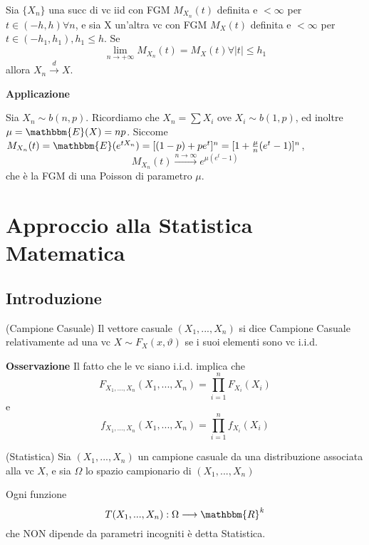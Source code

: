 \begin{teo}
Sia $\{X_n\}$ una succ di vc iid con FGM $M_{X_n}(t)$ definita e $<\infty$ per $t\in(-h,h) \forall n$, e sia X un'altra vc con FGM $M_X(t)$ definita e $<\infty$ per $t \in (-h_1,h_1), h_1\leq h$. Se $$\lim_{n \rightarrow +\infty} M_{X_n}(t)=M_X(t) \forall |t| \leq h_1$$ allora $X_n \stackrel{d}{\rightarrow} X$.
\end{teo}
\textbf{Applicazione}

Sia $X_n \sim b(n,p)$. 
Ricordiamo che $X_n=\sum X_i$ ove $X_i \sim b(1,p)$, ed inoltre $\mu=\mathbbm{E}(X)=np$.
Siccome $M_{X_n}(t)=
\mathbbm{E}(e^{tX_n})=[(1-p)+pe^t]^n=
[1+\frac{\mu}{n}(e^t - 1)]^n$, 
$$ M_{X_n}(t) \stackrel{n \rightarrow \infty}{\longrightarrow} 
e^{\mu(e^t-1)}$$
che è la FGM di una Poisson di parametro $\mu$.

\section{Approccio alla Statistica Matematica}

\subsection{Introduzione}

\begin{definizione} (Campione Casuale)
Il vettore casuale $(X_1,...,X_n)$ si dice Campione Casuale relativamente ad una vc $X \sim F_X(x,\vartheta)$ se i suoi elementi sono vc i.i.d.
\end{definizione}
\textbf{Osservazione}
Il fatto che le vc siano i.i.d. implica che $$F_{X_1,...,X_n}(X_1,...,X_n)=\prod_{i=1}^n F_{X_i} (X_i)$$ e $$f_{X_1,...,X_n}(X_1,...,X_n)=\prod_{i=1}^n f_{X_i} (X_i)$$

\begin{definizione} (Statistica)
Sia $(X_1,...,X_n)$ un campione casuale da una distribuzione associata alla vc $X$, e sia $\Omega$ lo spazio campionario di $(X_1,...,X_n)$

\noindent Ogni funzione $$T(X_1,...,X_n):\Omega \longrightarrow \mathbbm{R}^k$$ che NON dipende da parametri incogniti è detta Statistica.
\end{definizione}

